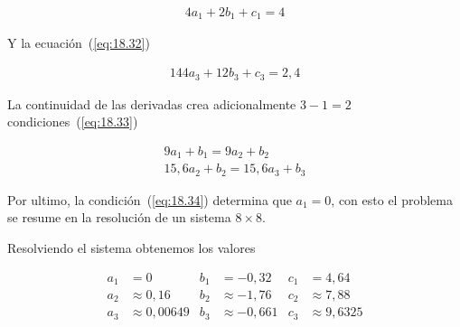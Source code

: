 \documentclass[conference]{IEEEtran}
\begin{document}
\begin{align*}
	4a_{1} + 2b_{1} + c_{1} = 4
\end{align*}

Y la ecuación~(\ref{eq:18.32})

\begin{align*}
	144a_{3} + 12b_{3} + c_{3} = 2,4
\end{align*}

La continuidad de las derivadas crea adicionalmente $3 - 1 = 2$ condiciones~(\ref{eq:18.33})

\begin{align*}
	9a_{1} + b_{1} = 9a_{2} + b_{2} \\
	15,6a_{2} + b_{2} = 15,6a_{3} + b_{3}
\end{align*}

Por ultimo, la condición~(\ref{eq:18.34}) determina que $a_{1} = 0$, con esto
el problema se resume en la resolución de un sistema $8 \times 8$.

Resolviendo el sistema obtenemos los valores

\begin{align*}
	a_{1} & = 0             & b_{1} & = -0,32        & c_{1} & = 4,64         \\
	a_{2} & \approx  0,16   & b_{2} & \approx -1,76  & c_{2} & \approx 7,88   \\
	a_{3} & \approx 0,00649 & b_{3} & \approx -0,661 & c_{3} & \approx 9,6325 \\
\end{align*}


\end{document}
